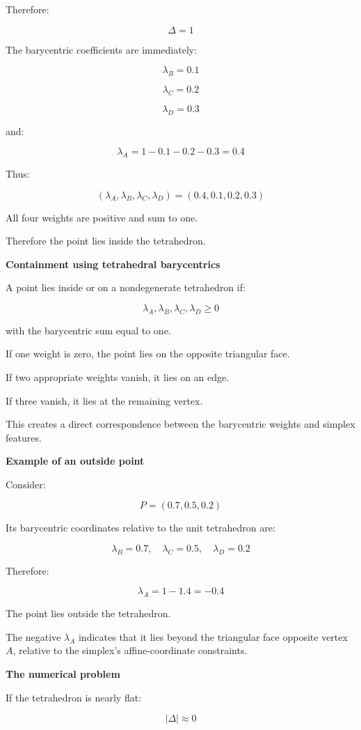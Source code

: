 Therefore:

\[
\Delta=1
\]

The barycentric coefficients are immediately:

\[
\lambda_B=0.1
\]

\[
\lambda_C=0.2
\]

\[
\lambda_D=0.3
\]

and:

\[
\lambda_A=1-0.1-0.2-0.3=0.4
\]

Thus:

\[
\boxed{ (\lambda_A,\lambda_B,\lambda_C,\lambda_D) =(0.4,0.1,0.2,0.3) }
\]

All four weights are positive and sum to one.

Therefore the point lies inside the tetrahedron.

\textbf{Containment using tetrahedral barycentrics}

A point lies inside or on a nondegenerate tetrahedron if:

\[
\boxed{ \lambda_A,\lambda_B,\lambda_C,\lambda_D\ge0 }
\]

with the barycentric sum equal to one.

If one weight is zero, the point lies on the opposite triangular face.

If two appropriate weights vanish, it lies on an edge.

If three vanish, it lies at the remaining vertex.

This creates a direct correspondence between the barycentric weights and simplex features.

\textbf{Example of an outside point}

Consider:

\[
P=(0.7,0.5,0.2)
\]

Its barycentric coordinates relative to the unit tetrahedron are:

\[
\lambda_B=0.7,\quad\lambda_C=0.5,\quad\lambda_D=0.2
\]

Therefore:

\[
\lambda_A=1-1.4=-0.4
\]

The point lies outside the tetrahedron.

The negative \(\lambda_A\) indicates that it lies beyond the triangular face opposite vertex \(A\), relative to the simplex's affine-coordinate constraints.

\textbf{The numerical problem}

If the tetrahedron is nearly flat:

\[
|\Delta|\approx0
\]


